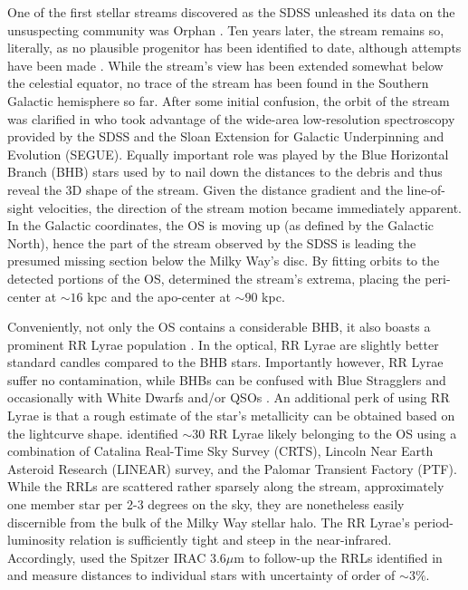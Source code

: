 \documentclass[a4paper,useAMS,usenatbib]{mnras}
\begin{document}
One of the first stellar streams discovered as the SDSS unleashed its
data on the unsuspecting community was Orphan
\citep[see][]{OS_C,OS_V}. Ten years later, the stream remains so,
literally, as no plausible progenitor has been identified to date,
although attempts have been made
\citep[e.g.][]{Fellhauer2007,Jin2007,Sales2008,Casey2013,Casey2014,Grillmair2015}. While
the stream's view has been extended somewhat below the celestial
equator, no trace of the stream has been found in the Southern
Galactic hemisphere so far. After some initial confusion, the orbit
of the stream was clarified in \citet{Newberg2010} who took advantage
of the wide-area low-resolution spectroscopy provided by the SDSS and
the Sloan Extension for Galactic Underpinning and Evolution
(SEGUE). Equally important role was played by the Blue Horizontal
Branch (BHB) stars used by \citet{Newberg2010} to nail down the
distances to the debris and thus reveal the 3D shape of the
stream. Given the distance gradient and the line-of-sight velocities,
the direction of the stream motion became immediately apparent. In the
Galactic coordinates, the OS is moving up (as defined by the Galactic
North), hence the part of the stream observed by the SDSS is leading
the presumed missing section below the Milky Way's disc. By fitting
orbits to the detected portions of the OS, \citet{Newberg2010}
determined the stream's extrema, placing the peri-center at $\sim16$
kpc and the apo-center at $\sim90$ kpc.

Conveniently, not only the OS contains a considerable BHB, it also
boasts a prominent RR Lyrae population \cite[see
  e.g.][]{Sesar2013}. In the optical, RR Lyrae are slightly better
standard candles compared to the BHB stars. Importantly however, RR
Lyrae suffer no contamination, while BHBs can be confused with Blue
Stragglers and occasionally with White Dwarfs and/or QSOs \citep[see
  e.g.][]{Deason2014}. An additional perk of using RR Lyrae is that a
rough estimate of the star's metallicity can be obtained based on the
lightcurve shape. \citet{Sesar2013} identified $\sim30$ RR Lyrae
likely belonging to the OS using a combination of Catalina Real-Time
Sky Survey (CRTS), Lincoln Near Earth Asteroid Research (LINEAR)
survey, and the Palomar Transient Factory (PTF). While the RRLs are
scattered rather sparsely along the stream, approximately one member
star per 2-3 degrees on the sky, they are nonetheless easily
discernible from the bulk of the Milky Way stellar halo. The RR
Lyrae's period-luminosity relation is sufficiently tight and steep in
the near-infrared. Accordingly, \citet{Hendel2018} used the Spitzer
IRAC 3.6$\mu$m to follow-up the RRLs identified in \citet{Sesar2010}
and measure distances to individual stars with uncertainty of order of
$\sim3\%$.
\end{document}
